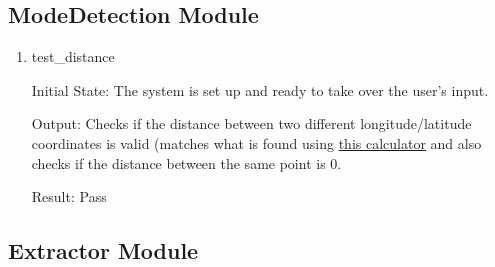 \documentclass[12pt, titlepage]{article}
\begin{document}
\subsection{ModeDetection Module}

\begin{enumerate}
    \item{test\_distance} \label{test_distance}

    Initial State: The system is set up and ready to take over the user’s input.

    Output: Checks if the distance between two different longitude/latitude coordinates is valid (matches what is found using \href{https://www.nhc.noaa.gov/gccalc.shtml}{this calculator} and also checks if the distance between the same point is 0.

    Result: Pass
    
\end{enumerate}

\subsection{Extractor Module}
\end{document}
